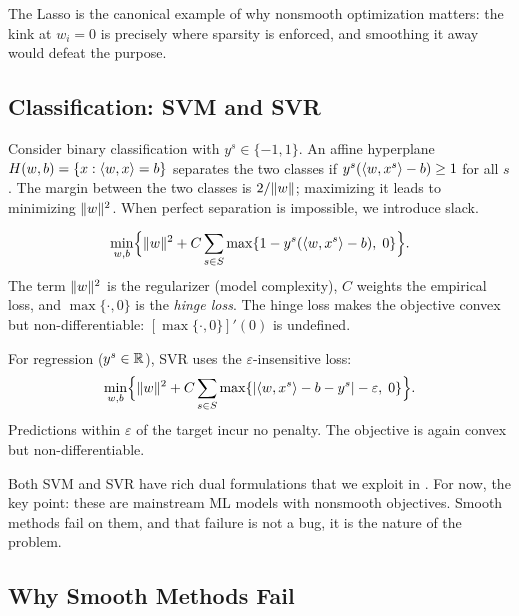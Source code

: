 The Lasso is the canonical example of why nonsmooth optimization matters: the kink at $w_i = 0$ is precisely where sparsity is enforced, and smoothing it away would defeat the purpose.


\subsection{Classification: SVM and SVR}\label{sec:svm-svr}

Consider binary classification with $y^s \in \{-1, 1\}$.
An affine hyperplane $H(w, b) = \{x : \langle w, x\rangle = b\}$ separates the two classes if $y^s(\langle w, x^s\rangle - b) \geq 1$ for all $s$.
The margin between the two classes is $2/\lVert w\rVert$; maximizing it leads to minimizing $\lVert w\rVert^2$.
When perfect separation is impossible, we introduce slack.

\begin{definition}\label{def:svm}
	\begin{equation}\label{eq:svm}
		\min_{w, b}\Bigl\{\lVert w\rVert^2 + C \sum_{s \in S} \max\{1 - y^s(\langle w, x^s\rangle - b),\; 0\}\Bigr\}.
	\end{equation}
	The term $\lVert w\rVert^2$ is the regularizer (model complexity), $C$ weights the empirical loss, and $\max\{\cdot, 0\}$ is the \emph{hinge loss}.
	The hinge loss makes the objective convex but non-differentiable: $[\max\{\cdot, 0\}]'(0)$ is undefined.
\end{definition}

\begin{definition}\label{def:svr}
	For regression ($y^s \in \mathbb{R}$), SVR uses the $\varepsilon$-insensitive loss:
	\begin{equation}\label{eq:svr}
		\min_{w, b}\Bigl\{\lVert w\rVert^2 + C \sum_{s \in S} \max\{|\langle w, x^s\rangle - b - y^s| - \varepsilon,\; 0\}\Bigr\}.
	\end{equation}
	Predictions within $\varepsilon$ of the target incur no penalty.
	The objective is again convex but non-differentiable.
\end{definition}

Both SVM and SVR have rich dual formulations that we exploit in .
For now, the key point: these are mainstream ML models with nonsmooth objectives.
Smooth methods fail on them, and that failure is not a bug, it is the nature of the problem.


\subsection{Why Smooth Methods Fail}\label{sec:smooth-fail}

